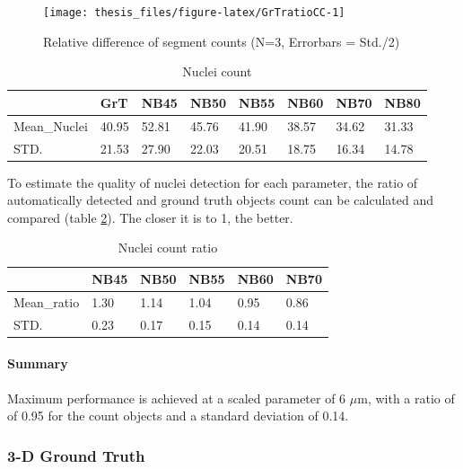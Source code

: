 \documentclass[11pt,singlespacinge,twoside]{reedthesis} %
\begin{document}
\begin{figure}

{\centering \texttt{[image: thesis\_files/figure-latex/GrTratioCC-1]} 

}

\caption[Relative difference of segment counts]{Relative difference of segment counts (N=3, Errorbars = Std./2)}\label{fig:GrTratioCC}
\end{figure}
\begin{table}[t]

\caption{\label{tab:meanabsnuc}Nuclei count}
\centering
\begin{tabular}{llllllll}
\toprule
  & GrT & NB45 & NB50 & NB55 & NB60 & NB70 & NB80\\
\midrule
Mean\_Nuclei & 40.95 & 52.81 & 45.76 & 41.90 & 38.57 & 34.62 & 31.33\\
STD. & 21.53 & 27.90 & 22.03 & 20.51 & 18.75 & 16.34 & 14.78\\
\bottomrule
\end{tabular}
\end{table}
\noindent To estimate the quality of nuclei detection for each parameter, the ratio of automatically detected and ground truth objects count can be calculated and compared (table \ref{tab:nrcount}). The closer it is to 1, the better.
\begin{table}[t]

\caption{\label{tab:nrcount}Nuclei count ratio}
\centering
\begin{tabular}{llllll}
\toprule
  & NB45 & NB50 & NB55 & NB60 & NB70\\
\midrule
Mean\_ratio & 1.30 & 1.14 & 1.04 & 0.95 & 0.86\\
STD. & 0.23 & 0.17 & 0.15 & 0.14 & 0.14\\
\bottomrule
\end{tabular}
\end{table}
\hypertarget{summary-1}{%
\paragraph{Summary}\label{summary-1}}

Maximum performance is achieved at a scaled parameter of 6 \(\mu\)m, with a ratio of of 0.95 for the count objects and a standard deviation of 0.14.

\hypertarget{d-ground-truth-1}{%
\subsubsection{3-D Ground Truth}\label{d-ground-truth-1}}
\end{document}
